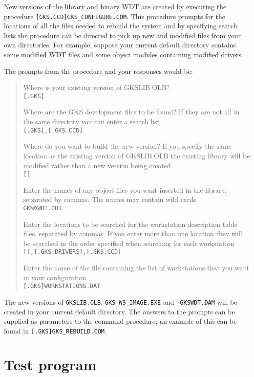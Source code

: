 New versions of the library and binary WDT are created by executing the
procedure {\tt [GKS.CCD]\-GKS\_CONFIGURE.\-COM}. This procedure prompts for the
locations of all the files needed to rebuild the system and by specifying
search lists the procedure can be directed to pick up new and modified files
from your own directories. For example, suppose your current default directory
contains some modified WDT files and some object modules containing modified
drivers.

The prompts from the procedure and your responses would be:
\begin{quote}
Where is your existing version of GKSLIB.OLB?\\
{\tt [.GKS]}

Where are the GKS development files to be found?
If they are not all in the same directory you can enter a search list\\
{\tt [.GKS],[.GKS.CCD]}

Where do you want to build the new version?
If you specify the same location as the existing version of GKSLIB.OLB the
existing library will be modified rather than a new version being created\\
{\tt []}

Enter the names of any object files you want inserted in the library, separated
by commas.
The names may contain wild cards\\
{\tt GK\%\%WDT.OBJ}

Enter the locations to be searched for the workstation description table files,
separated by commas.
If you enter more than one location they will be searched in the order
specified when searching for each workstation\\
{\tt [],[.GKS.DRIVERS],[.GKS.CCD]}

Enter the name of the file containing the list of workstations that you
want in your configuration\\
{\tt [.GKS]WORKSTATIONS.DAT}
\end{quote}

The new versions of {\tt GKSLIB.OLB}, {\tt GKS\_WS\_IMAGE.EXE} and {\tt
GKSWDT.DAM} will be created in your current default directory. The answers to
the prompts can be supplied as parameters to the command procedure; an example
of this can be found in {\tt [.GKS]GKS\_REBUILD.COM}.

\section{Test program}

